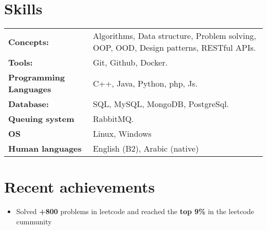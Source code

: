 \documentclass[a4,10pt]{article}
\newenvironment{zitemize}{
\begin{itemize}\itemsep0pt \parskip0pt \parsep1pt}
{\end{itemize}\vspace{-0.5cm}}
\newcommand{\hskills}[1]{
\textbf{\bfseries #1} }
\begin{document}
\section{Skills}
\begin{tabular}{p{14em} p{48em}}
\hskills{Concepts:} &  Algorithms, Data structure, Problem solving, OOP, OOD, Design
patterns, RESTful APIs. \\
\hskills{Tools:} & Git, Github, Docker.  \\
\hskills{Programming Languages} & C++, Java, Python, php, Js. \\
\hskills{Database:} & SQL, MySQL, MongoDB, PostgreSql. \\
\hskills{Queuing system} & RabbitMQ. \\
\hskills{OS} & Linux, Windows \\
\hskills{Human languages} & English (B2), Arabic (native) \\
\end{tabular}
\vspace{-0.2cm}


\section{Recent achievements} 
\renewcommand\refname{\vskip -1.5em}
\begin{zitemize}
    \item Solved \textbf{+800} problems in leetcode and reached the \textbf{top 9\%} in the
    leetcode cummunity
\end{zitemize}
\printbibliography[heading=none]
\vspace{-0.4cm}


\end{document}
